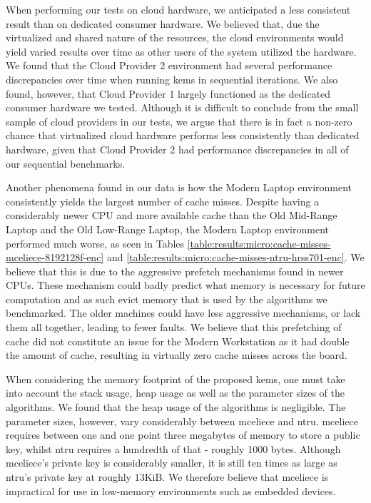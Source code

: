 When performing our tests on cloud hardware, we anticipated a less consistent result than on dedicated consumer hardware. We believed that, due the virtualized and shared nature of the resources, the cloud environments would yield varied results over time as other users of the system utilized the hardware. We found that the Cloud Provider 2 environment had several performance discrepancies over time when running \glspl{kem} in sequential iterations. We also found, however, that Cloud Provider 1 largely functioned as the dedicated consumer hardware we tested. Although it is difficult to conclude from the small sample of cloud providers in our tests, we argue that there is in fact a non-zero chance that virtualized cloud hardware performs less consistently than dedicated hardware, given that Cloud Provider 2 had performance discrepancies in all of our sequential benchmarks. 

Another phenomena found in our data is how the Modern Laptop environment consistently yields the largest number of cache misses. Despite having a considerably newer CPU and more available cache than the Old Mid-Range Laptop and the Old Low-Range Laptop, the Modern Laptop environment performed much worse, as seen in Tables \ref{table:results:micro:cache-misses-mceliece-8192128f-enc} and \ref{table:results:micro:cache-misses-ntru-hrss701-enc}. We believe that this is due to the aggressive prefetch mechanisms found in newer CPUs. These mechanism could badly predict what memory is necessary for future computation and as such evict memory that is used by the algorithms we benchmarked. The older machines could have less aggressive mechanisms, or lack them all together, leading to fewer faults. We believe that this prefetching of cache did not constitute an issue for the Modern Workstation as it had double the amount of cache, resulting in virtually zero cache misses across the board.

When considering the memory footprint of the proposed \glspl{kem}, one must take into account the stack usage, heap usage as well as the parameter sizes of the algorithms. We found that the heap usage of the algorithms is negligible. The parameter sizes, however, vary considerably between \gls{mceliece} and \gls{ntru}. \gls{mceliece} requires between one and one point three megabytes of memory to store a public key, whilst \gls{ntru} requires a hundredth of that - roughly 1000 bytes. Although \gls{mceliece}'s private key is considerably smaller, it is still ten times as large as \gls{ntru}'s private key at roughly 13KiB. We therefore believe that \gls{mceliece} is impractical for use in low-memory environments such as embedded devices.

